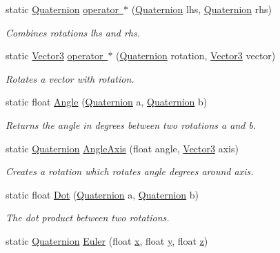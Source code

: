 \begin{DoxyCompactItemize}
static \mbox{\hyperlink{class_lua_1_1_quaternion}{Quaternion}} \mbox{\hyperlink{class_lua_1_1_quaternion_af6d179e922217cf36197ed89c6cff2a4}{operator $\ast$}} (\mbox{\hyperlink{class_lua_1_1_quaternion}{Quaternion}} lhs, \mbox{\hyperlink{class_lua_1_1_quaternion}{Quaternion}} rhs)
\begin{DoxyCompactList}\small\item\em Combines rotations lhs and rhs. \end{DoxyCompactList}\item 
static \mbox{\hyperlink{class_lua_1_1_vector3}{Vector3}} \mbox{\hyperlink{class_lua_1_1_quaternion_a7a0f65d72a342ca595d8a3a7f53b0892}{operator $\ast$}} (\mbox{\hyperlink{class_lua_1_1_quaternion}{Quaternion}} rotation, \mbox{\hyperlink{class_lua_1_1_vector3}{Vector3}} vector)
\begin{DoxyCompactList}\small\item\em Rotates a vector with rotation. \end{DoxyCompactList}\item 
static float \mbox{\hyperlink{class_lua_1_1_quaternion_a4094309a8c66c50017bd92ffdfeb3bfd}{Angle}} (\mbox{\hyperlink{class_lua_1_1_quaternion}{Quaternion}} a, \mbox{\hyperlink{class_lua_1_1_quaternion}{Quaternion}} b)
\begin{DoxyCompactList}\small\item\em Returns the angle in degrees between two rotations a and b. \end{DoxyCompactList}\item 
static \mbox{\hyperlink{class_lua_1_1_quaternion}{Quaternion}} \mbox{\hyperlink{class_lua_1_1_quaternion_a25f65fcc019124366264558209108498}{Angle\+Axis}} (float angle, \mbox{\hyperlink{class_lua_1_1_vector3}{Vector3}} axis)
\begin{DoxyCompactList}\small\item\em Creates a rotation which rotates angle degrees around axis. \end{DoxyCompactList}\item 
static float \mbox{\hyperlink{class_lua_1_1_quaternion_a8479fc724c544d8784afeae5778e6a27}{Dot}} (\mbox{\hyperlink{class_lua_1_1_quaternion}{Quaternion}} a, \mbox{\hyperlink{class_lua_1_1_quaternion}{Quaternion}} b)
\begin{DoxyCompactList}\small\item\em The dot product between two rotations. \end{DoxyCompactList}\item 
static \mbox{\hyperlink{class_lua_1_1_quaternion}{Quaternion}} \mbox{\hyperlink{class_lua_1_1_quaternion_ac7134c2bdc28902fc519d42b7b803d9f}{Euler}} (float \mbox{\hyperlink{class_lua_1_1_quaternion_aefb405b7fafa79708a6d8120781debce}{x}}, float \mbox{\hyperlink{class_lua_1_1_quaternion_ab7eb002a81cfc537a9c3afc8965ef2ec}{y}}, float \mbox{\hyperlink{class_lua_1_1_quaternion_ac26c0a2710dd86783dee62c8645ee55c}{z}})

\end{DoxyCompactItemize}
